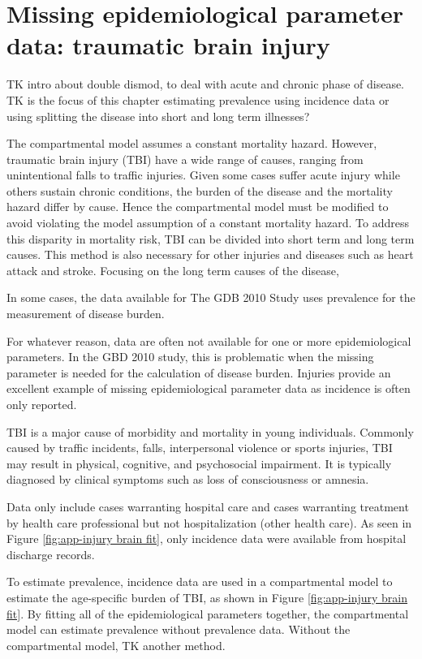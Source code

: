 \chapter{Missing epidemiological parameter data: traumatic brain injury}
\label{applications-double_dismod}

TK intro about double dismod, to deal with acute and chronic phase of disease.
TK is the focus of this chapter estimating prevalence using incidence data
or using splitting the disease into short and long term illnesses?

The compartmental model assumes a constant mortality hazard.
However, traumatic brain injury (TBI) have a wide range of
causes, ranging from unintentional falls to traffic injuries.
Given some cases suffer acute injury while others sustain
chronic conditions, the burden of the disease and the mortality hazard
differ by cause.  Hence the compartmental model must be modified
to avoid violating the model assumption of a
constant mortality hazard.  To address this disparity in mortality
risk, TBI can be divided into short term and long term
causes.  This method is also necessary for other injuries and
diseases such as heart attack and stroke.  Focusing on the long term
causes of the disease, 


In some cases, the data available for The GDB 2010 Study uses
prevalence for the measurement of disease burden.

For whatever reason, data are often not available for one or more
epidemiological parameters.  In the GBD 2010 study, this is
problematic when the missing parameter is needed for the calculation
of disease burden.  Injuries provide an excellent example of missing
epidemiological parameter data as incidence is often only reported.

TBI is a major cause of morbidity and
mortality in young individuals. Commonly caused by traffic
incidents, falls, interpersonal violence or sports injuries,
TBI may result in physical, cognitive, and psychosocial impairment.
It is typically diagnosed by clinical symptoms such as loss of
consciousness or amnesia. \cite{maas_moderate_2008, nih_rehabilitation_1999,
bruns_epidemiology_2003}

Data only include cases warranting hospital care and cases warranting
treatment by health care professional but not hospitalization (other
health care).  As seen in Figure \ref{fig:app-injury brain fit},
only incidence data were available from hospital discharge records.

To estimate prevalence, incidence data are used in a compartmental model to estimate the
age-specific burden of TBI, as shown in Figure
\ref{fig:app-injury brain fit}.  By fitting all of the epidemiological
parameters together, the compartmental model can estimate prevalence
without prevalence data.  Without the compartmental model, TK another method.

